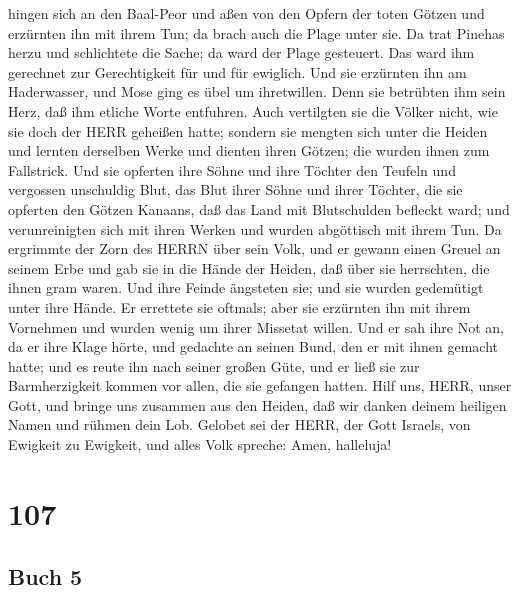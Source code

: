 hingen sich an den Baal-Peor und aßen von den Opfern der toten Götzen
 und erzürnten ihn mit ihrem Tun; da brach auch die Plage
unter sie.  Da trat Pinehas herzu und schlichtete die
Sache; da ward der Plage gesteuert.  Das ward ihm gerechnet
zur Gerechtigkeit für und für ewiglich.  Und sie erzürnten
ihn am Haderwasser, und Mose ging es übel um ihretwillen. 
Denn sie betrübten ihm sein Herz, daß ihm etliche Worte entfuhren.
 Auch vertilgten sie die Völker nicht, wie sie doch der
HERR geheißen hatte;  sondern sie mengten sich unter die
Heiden und lernten derselben Werke  und dienten ihren
Götzen; die wurden ihnen zum Fallstrick.  Und sie opferten
ihre Söhne und ihre Töchter den Teufeln  und vergossen
unschuldig Blut, das Blut ihrer Söhne und ihrer Töchter, die sie
opferten den Götzen Kanaans, daß das Land mit Blutschulden befleckt
ward;  und verunreinigten sich mit ihren Werken und wurden
abgöttisch mit ihrem Tun.  Da ergrimmte der Zorn des HERRN
über sein Volk, und er gewann einen Greuel an seinem Erbe 
und gab sie in die Hände der Heiden, daß über sie herrschten, die ihnen
gram waren.  Und ihre Feinde ängsteten sie; und sie wurden
gedemütigt unter ihre Hände.  Er errettete sie oftmals;
aber sie erzürnten ihn mit ihrem Vornehmen und wurden wenig um ihrer
Missetat willen.  Und er sah ihre Not an, da er ihre Klage
hörte,  und gedachte an seinen Bund, den er mit ihnen
gemacht hatte; und es reute ihn nach seiner großen Güte, 
und er ließ sie zur Barmherzigkeit kommen vor allen, die sie gefangen
hatten.  Hilf uns, HERR, unser Gott, und bringe uns
zusammen aus den Heiden, daß wir danken deinem heiligen Namen und rühmen
dein Lob.  Gelobet sei der HERR, der Gott Israels, von
Ewigkeit zu Ewigkeit, und alles Volk spreche: Amen, halleluja!

\hypertarget{section-106}{%
\section{107}\label{section-106}}

\hypertarget{buch-5}{%
\subsection{Buch 5}\label{buch-5}}

